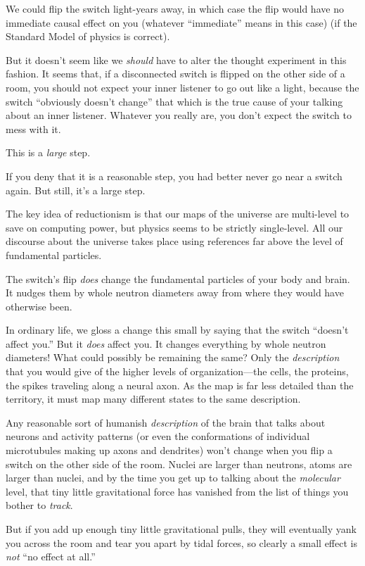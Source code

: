 {
 We could flip the switch light-years away, in which case the flip
would have no immediate causal effect on you (whatever
``immediate'' means in this case)
(if the Standard Model of physics is correct).}

{
 But it doesn't seem like we \textit{should} have
to alter the thought experiment in this fashion. It seems that, if a
disconnected switch is flipped on the other side of a room, you should
not expect your inner listener to go out like a light, because the
switch ``obviously doesn't
change'' that which is the true cause of your talking
about an inner listener. Whatever you really are, you
don't expect the switch to mess with it.}

{
 This is a \textit{large} step.}

{
 If you deny that it is a reasonable step, you had better never go
near a switch again. But still, it's a large step.}

{
 The key idea of reductionism is that our maps of the universe are
multi-level to save on computing power, but physics seems to be
strictly single-level. All our discourse about the universe takes place
using references far above the level of fundamental particles.}

{
 The switch's flip \textit{does} change the
fundamental particles of your body and brain. It nudges them by whole
neutron diameters away from where they would have otherwise been.}

{
 In ordinary life, we gloss a change this small by saying that the
switch ``doesn't affect
you.'' But it \textit{does} affect you. It changes
everything by whole neutron diameters! What could possibly be remaining
the same? Only the \textit{description} that you would give of the
higher levels of organization---the cells, the proteins, the spikes
traveling along a neural axon. As the map is far less detailed than the
territory, it must map many different states to the same description.}

{
 Any reasonable sort of humanish \textit{description} of the brain
that talks about neurons and activity patterns (or even the
conformations of individual microtubules making up axons and dendrites)
won't change when you flip a switch on the other side
of the room. Nuclei are larger than neutrons, atoms are larger than
nuclei, and by the time you get up to talking about the
\textit{molecular} level, that tiny little gravitational force has
vanished from the list of things you bother to \textit{track}.}

{
 But if you add up enough tiny little gravitational pulls, they
will eventually yank you across the room and tear you apart by tidal
forces, so clearly a small effect is \textit{not} ``no
effect at all.''}

